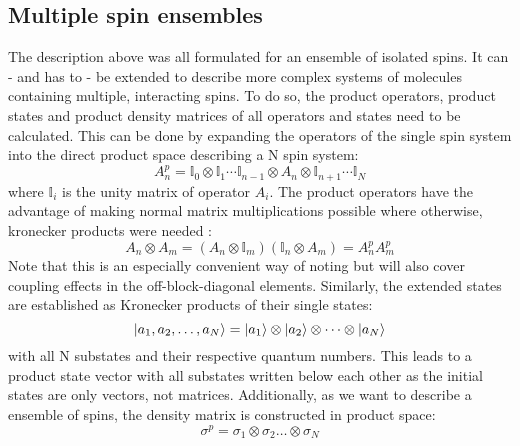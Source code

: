         \subsection{Multiple spin ensembles}
            The description above was all formulated for an ensemble of isolated spins. It can - and has to - be extended to describe more complex systems of molecules containing multiple, interacting spins. To do so, the product operators, product states and product density matrices of all operators and states need to be calculated. This can be done by expanding the operators of the single spin system into the direct product space describing a N spin system:
            \begin{equation*}
                A^p_n = \mathbb{I}_0\otimes\mathbb{I}_1\cdots \mathbb{I}_{n-1} \otimes A_n \otimes \mathbb{I}_{n+1}\cdots \mathbb{I}_N
            \end{equation*}
            where $\mathbb{I}_i$ is the unity matrix of operator $A_i$. The product operators have the advantage of making normal matrix multiplications possible where otherwise, kronecker products were needed \cite{green_theory_2012-1}:
            \begin{equation}
                A_n\otimes A_m = (A_n \otimes \mathbb{I}_m)(\mathbb{I}_n \otimes A_m) = A^p_nA^p_m
            \end{equation}
            Note that this is an especially convenient way of noting but will also cover coupling effects in the off-block-diagonal elements. Similarly, the extended states are established as Kronecker products of their single states:
            \begin{equation}
                \ket{a_1,a_2, \dots, a_N} = \ket{a_1}\otimes\ket{a_2}\otimes\dots\otimes\ket{a_N}
            \end{equation}
            with all N substates and their respective quantum numbers. This leads to a product state vector with all substates written below each other as the initial states are only vectors, not matrices. Additionally, as we want to describe a ensemble of spins, the density matrix is constructed in product space:
            \begin{equation}
                \sigma^p = \sigma_1 \otimes\sigma_2\dots\otimes\sigma_N
            \end{equation}
